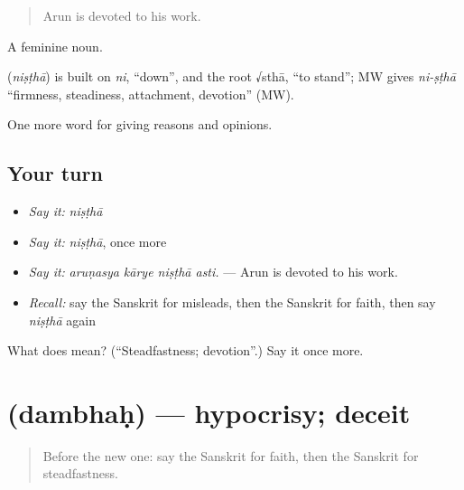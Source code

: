 \begin{quote}
Arun is devoted to his work.
\end{quote}

A feminine noun.

\begin{cousinweb}
\textbf{} (\emph{niṣṭhā}) is built on \emph{ni}, \textquotedblleft{}down\textquotedblright{}, and the root √sthā, \textquotedblleft{}to stand\textquotedblright{}; MW gives \emph{ni-ṣṭhā} \textquotedblleft{}firmness, steadiness, attachment, devotion\textquotedblright{} (MW).
\end{cousinweb}

\begin{grammarlens}[title={What you've built}]
One more word for giving reasons and opinions.
\end{grammarlens}

\subsection*{Your turn}
\begin{itemize}
\raggedright
  \item \emph{Say it:} \emph{niṣṭhā}
  \item \emph{Say it:} \emph{niṣṭhā}, once more
  \item \emph{Say it:} \emph{aruṇasya kārye niṣṭhā asti.} — Arun is devoted to his work.
  \item \emph{Recall:} say the Sanskrit for misleads, then the Sanskrit for faith, then say \emph{niṣṭhā} again
\end{itemize}

\begin{tcolorbox}[breakable,colback=teal!4,colframe=teal!35!black,title={Before you move on}]
What does  mean? (\textquotedblleft{}Steadfastness; devotion\textquotedblright{}.) Say it once more.
\end{tcolorbox}
\section[\texorpdfstring{\sk{दम्भः} (dambhaḥ)}{दम्भः (dambhaḥ)}]{ (dambhaḥ) — hypocrisy; deceit}

\label{lesson:SA-C361-dambhah}



\begin{quote}
Before the new one: say the Sanskrit for faith, then the Sanskrit for steadfastness.
\end{quote}


